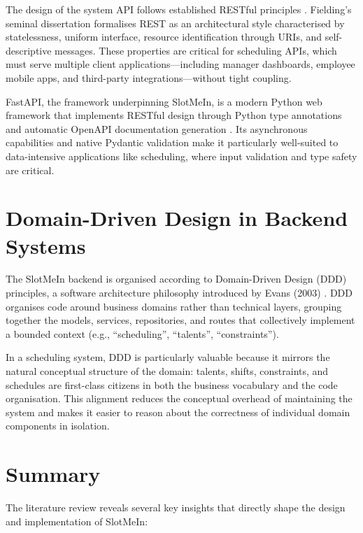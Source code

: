 \documentclass[12pt,a4paper]{report}
\begin{document}
The design of the system API follows established RESTful principles \cite{fielding_2000}. Fielding's seminal dissertation formalises REST as an architectural style characterised by statelessness, uniform interface, resource identification through URIs, and self-descriptive messages. These properties are critical for scheduling APIs, which must serve multiple client applications—including manager dashboards, employee mobile apps, and third-party integrations—without tight coupling.

FastAPI, the framework underpinning SlotMeIn, is a modern Python web framework that implements RESTful design through Python type annotations and automatic OpenAPI documentation generation \cite{ramirez_2019}. Its asynchronous capabilities and native Pydantic validation make it particularly well-suited to data-intensive applications like scheduling, where input validation and type safety are critical.

\section{Domain-Driven Design in Backend Systems}

The SlotMeIn backend is organised according to Domain-Driven Design (DDD) principles, a software architecture philosophy introduced by Evans (2003) \cite{evans_2003}. DDD organises code around business domains rather than technical layers, grouping together the models, services, repositories, and routes that collectively implement a bounded context (e.g., ``scheduling'', ``talents'', ``constraints'').

In a scheduling system, DDD is particularly valuable because it mirrors the natural conceptual structure of the domain: talents, shifts, constraints, and schedules are first-class citizens in both the business vocabulary and the code organisation. This alignment reduces the conceptual overhead of maintaining the system and makes it easier to reason about the correctness of individual domain components in isolation.

\section{Summary}

The literature review reveals several key insights that directly shape the design and implementation of SlotMeIn:
\end{document}

